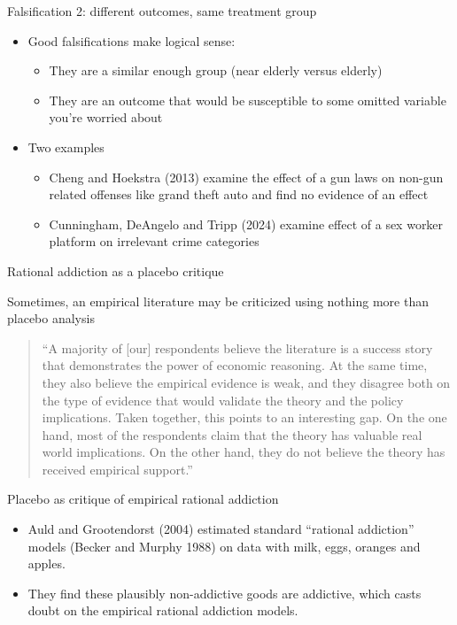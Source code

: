 \documentclass{beamer}
\begin{document}
\begin{frame}{Falsification 2: different outcomes, same treatment group}
	\begin{itemize}
	\item Good falsifications make logical sense:  
		\begin{itemize}
		\item They are a similar enough group (near elderly versus elderly) 
		\item They are an outcome that would be susceptible to some omitted variable you're worried about
		\end{itemize}
	\item Two examples
		\begin{itemize}
		\item Cheng and Hoekstra (2013) examine the effect of a gun laws on non-gun related offenses like grand theft auto and find no evidence of an effect 
		\item Cunningham, DeAngelo and Tripp (2024) examine effect of a sex worker platform on irrelevant crime categories
		\end{itemize}
	\end{itemize}
\end{frame}



\begin{frame}{Rational addiction as a placebo critique}


Sometimes, an empirical literature may be criticized using nothing more than placebo analysis

\begin{quote}``A majority of [our] respondents believe the literature is a success story that demonstrates the power of economic reasoning.  At the same time, they also believe the empirical evidence is weak, and they disagree both on the type of evidence that would validate the theory and the policy implications. Taken together, this points to an interesting gap.  On the one hand, most of the respondents claim that the theory has valuable real world implications.  On the other hand, they do not believe the theory has received empirical support.''
\end{quote}

\end{frame}

\begin{frame}{Placebo as critique of empirical rational addiction}

\begin{itemize}
	\item Auld and Grootendorst (2004) estimated standard ``rational addiction'' models (Becker and Murphy 1988) on data with milk, eggs, oranges and apples.  
	\item They find these plausibly non-addictive goods are addictive, which casts doubt on the empirical rational addiction models.
\end{itemize}

\end{frame}
\end{document}
